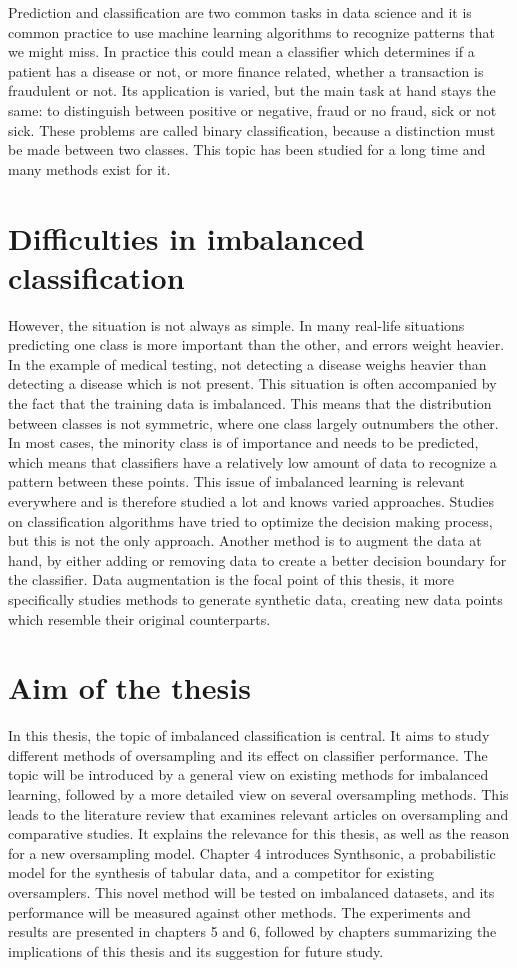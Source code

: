 Prediction and classification are two common tasks in data science and it is common practice to use machine learning algorithms to recognize patterns that we might miss. In practice this could mean a classifier which determines if a patient has a disease or not, or more finance related, whether a transaction is fraudulent or not. Its application is varied, but the main task at hand stays the same: to distinguish between positive or negative, fraud or no fraud, sick or not sick. These problems are called binary classification, because a distinction must be made between two classes. This topic has been studied for a long time and many methods exist for it. 

\section{Difficulties in imbalanced classification}
However, the situation is not always as simple. In many real-life situations predicting one class is more important than the other, and errors weight heavier. In the example of medical testing, not detecting a disease weighs heavier than detecting a disease which is not present. This situation is often accompanied by the fact that the training data is imbalanced. This means that the distribution between classes is not symmetric, where one class largely outnumbers the other. In most cases, the minority class is of importance and needs to be predicted, which means that classifiers have a relatively low amount of data to recognize a pattern between these points. This issue of imbalanced learning is relevant everywhere and is therefore studied a lot and knows varied approaches. Studies on classification algorithms have tried to optimize the decision making process, but this is not the only approach. Another method is to augment the data at hand, by either adding or removing data to create a better decision boundary for the classifier. Data augmentation is the focal point of this thesis, it more specifically studies methods to generate synthetic data, creating new data points which resemble their original counterparts. 

\section{Aim of the thesis}
In this thesis, the topic of imbalanced classification is central. It aims to study different methods of oversampling and its effect on classifier performance. The topic will be introduced by a general view on existing methods for imbalanced learning, followed by a more detailed view on several oversampling methods. This leads to the literature review that examines relevant articles on oversampling and comparative studies. It explains the relevance for this thesis, as well as the reason for a new oversampling model. Chapter 4 introduces Synthsonic, a probabilistic model for the synthesis of tabular data, and a competitor for existing oversamplers. This novel method will be tested on imbalanced datasets, and its performance will be measured against other methods. The experiments and results are presented in chapters 5 and 6, followed by chapters summarizing the implications of this thesis and its suggestion for future study.
